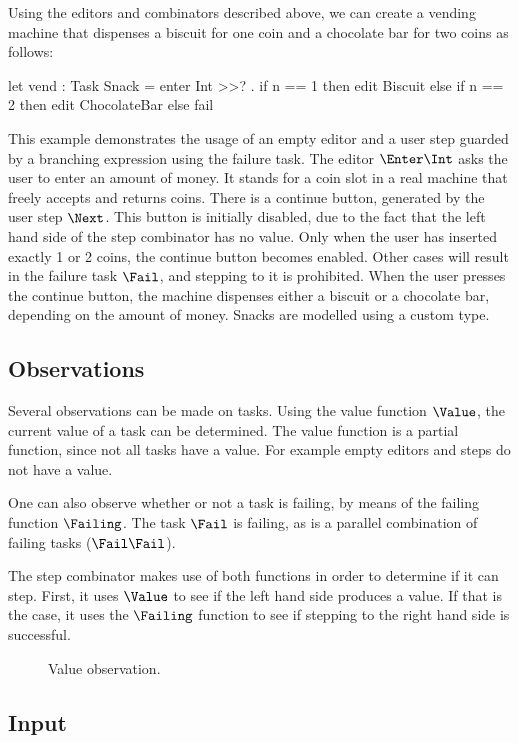 Using the editors and combinators described above,
we can create a vending machine that dispenses a biscuit for one coin and a chocolate bar for two coins as follows:
\begin{TASK}
  let vend : Task Snack = enter Int >>? \n.
    if n == 1 then edit Biscuit
    else if n == 2 then edit ChocolateBar
    else fail
\end{TASK}
This example demonstrates the usage of an empty editor and
a user step guarded by a branching expression using the failure task.
The editor $\Enter \Int$ asks the user to enter an amount of money.
It stands for a coin slot in a real machine that freely accepts and returns coins.
There is a continue button, generated by the user step $\Next$.
This button is initially disabled, due to the fact that the left hand side of the step combinator has no value.
Only when the user has inserted exactly 1 or 2 coins, the continue button becomes enabled.
Other cases will result in the failure task $\Fail$, and stepping to it is prohibited.
When the user presses the continue button, the machine dispenses either a biscuit or a chocolate bar, depending on the amount of money.
Snacks are modelled using a custom type.


\subsection{Observations}

Several observations can be made on tasks.
Using the value function $\Value$, the current value of a task can be determined.
The value function is a partial function, since not all tasks have a value.
For example empty editors and steps do not have a value.

One can also observe whether or not a task is failing, by means of the failing function $\Failing$.
The task $\Fail$ is failing, as is a parallel combination of failing tasks ($\Fail \And \Fail$).

The step combinator makes use of both functions in order to determine if it can step.
First, it uses $\Value$ to see if the left hand side produces a value.
If that is the case, it uses the $\Failing$ function to see if stepping to the right hand side is successful.

\begin{figure}[h]
  \centering \small
  \caption{
    Value observation.
  } \label{}
\end{figure}


\subsection{Input}

